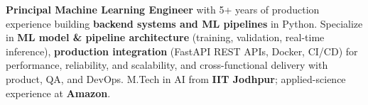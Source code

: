 \documentclass[letter,10pt]{article}
\begin{document}

\textbf{Principal Machine Learning Engineer} with 5+ years of production experience building \textbf{backend systems and ML pipelines} in Python.
Specialize in \textbf{ML model \& pipeline architecture} (training, validation, real-time inference), \textbf{production integration} (FastAPI REST APIs, Docker, CI/CD) for performance, reliability, and scalability, and cross-functional delivery with product, QA, and DevOps.
M.Tech in AI from \textbf{IIT Jodhpur}; applied-science experience at \textbf{Amazon}.
\end{document}
